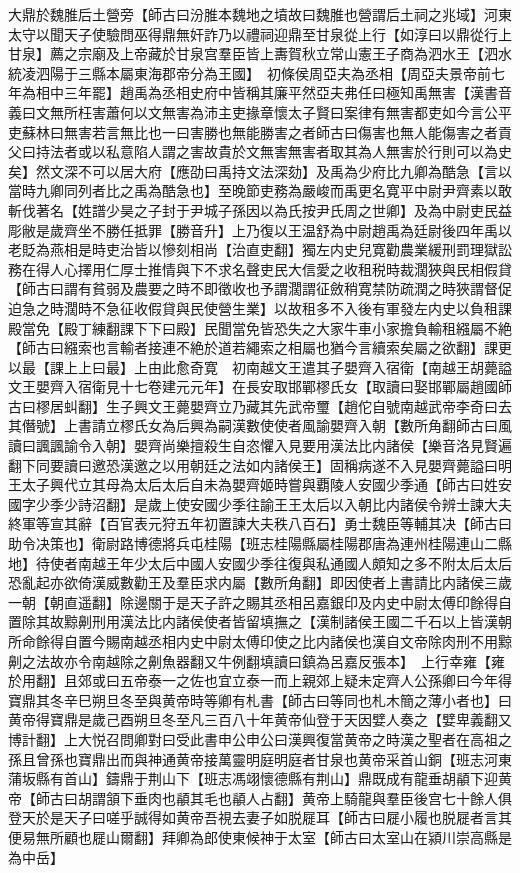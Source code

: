 大鼎於魏脽后土營旁【師古曰汾脽本魏地之墳故曰魏脽也營謂后土祠之兆域】河東太守以聞天子使驗問巫得鼎無奸詐乃以禮祠迎鼎至甘泉從上行【如淳曰以鼎從行上甘泉】薦之宗廟及上帝藏於甘泉宫羣臣皆上夀賀秋立常山憲王子商為泗水王【泗水統凌泗陽于三縣本屬東海郡帝分為王國】　初條侯周亞夫為丞相【周亞夫景帝前七年為相中三年罷】趙禹為丞相史府中皆稱其廉平然亞夫弗任曰極知禹無害【漢書音義曰文無所枉害蕭何以文無害為沛主吏掾章懷太子賢曰案律有無害都吏如今言公平吏蘇林曰無害若言無比也一曰害勝也無能勝害之者師古曰傷害也無人能傷害之者貢父曰持法者或以私意陷人謂之害故貴於文無害無害者取其為人無害於行則可以為史矣】然文深不可以居大府【應劭曰禹持文法深劾】及禹為少府比九卿為酷急【言以當時九卿同列者比之禹為酷急也】至晚節吏務為嚴峻而禹更名寛平中尉尹齊素以敢斬伐著名【姓譜少昊之子封于尹城子孫因以為氏按尹氏周之世卿】及為中尉吏民益彫敝是歲齊坐不勝任抵罪【勝音升】上乃復以王温舒為中尉趙禹為廷尉後四年禹以老貶為燕相是時吏治皆以慘刻相尚【治直吏翻】獨左内史兒寛勸農業緩刑罰理獄訟務在得人心擇用仁厚士推情與下不求名聲吏民大信愛之收租税時裁濶狹與民相假貸【師古曰謂有貧弱及農要之時不即徵收也予謂濶謂征斂稍寛禁防疏潤之時狹謂督促迫急之時濶時不急征收假貸與民使營生業】以故租多不入後有軍發左内史以負租課殿當免【殿丁練翻課下下曰殿】民聞當免皆恐失之大家牛車小家擔負輸租繦屬不絶【師古曰繦索也言輸者接連不絶於道若繩索之相屬也猶今言續索矣屬之欲翻】課更以最【課上上曰最】上由此愈奇寛　初南越文王遣其子嬰齊入宿衛【南越王胡薨謚文王嬰齊入宿衛見十七卷建元元年】在長安取邯鄲樛氏女【取讀曰娶邯鄲屬趙國師古曰樛居虯翻】生子興文王薨嬰齊立乃藏其先武帝璽【趙佗自號南越武帝李奇曰去其僭號】上書請立樛氏女為后興為嗣漢數使使者風諭嬰齊入朝【數所角翻師古曰風讀曰諷諷諭令入朝】嬰齊尚樂擅殺生自恣懼入見要用漢法比内諸侯【樂音洛見賢遍翻下同要讀曰邀恐漢邀之以用朝廷之法如内諸侯王】固稱病遂不入見嬰齊薨謚曰明王太子興代立其母為太后太后自未為嬰齊姬時嘗與覇陵人安國少季通【師古曰姓安國字少季少詩沼翻】是歲上使安國少季往諭王王太后以入朝比内諸侯令辨士諫大夫終軍等宣其辭【百官表元狩五年初置諫大夫秩八百石】勇士魏臣等輔其决【師古曰助令决策也】衛尉路博德將兵屯桂陽【班志桂陽縣屬桂陽郡唐為連州桂陽連山二縣地】待使者南越王年少太后中國人安國少季往復與私通國人頗知之多不附太后太后恐亂起亦欲倚漢威數勸王及羣臣求内屬【數所角翻】即因使者上書請比内諸侯三歲一朝【朝直遥翻】除邊關于是天子許之賜其丞相呂嘉銀印及内史中尉太傅印餘得自置除其故黥劓刑用漢法比内諸侯使者皆留填撫之【漢制諸侯王國二千石以上皆漢朝所命餘得自置今賜南越丞相内史中尉太傅印使之比内諸侯也漢自文帝除肉刑不用黥劓之法故亦令南越除之劓魚器翻又牛例翻填讀曰鎮為呂嘉反張本】　上行幸雍【雍於用翻】且郊或曰五帝泰一之佐也宜立泰一而上親郊上疑未定齊人公孫卿曰今年得寶鼎其冬辛巳朔旦冬至與黄帝時等卿有札書【師古曰等同也札木簡之薄小者也】曰黄帝得寶鼎是歲己酉朔旦冬至凡三百八十年黄帝仙登于天因嬖人奏之【嬖卑義翻又博計翻】上大悦召問卿對曰受此書申公申公曰漢興復當黄帝之時漢之聖者在高祖之孫且曾孫也寶鼎出而與神通黄帝接萬靈明庭明庭者甘泉也黄帝采首山銅【班志河東蒲坂縣有首山】鑄鼎于荆山下【班志馮翊懷德縣有荆山】鼎既成有龍垂胡䫇下迎黄帝【師古曰胡謂頷下垂肉也䫇其毛也䫇人占翻】黄帝上騎龍與羣臣後宫七十餘人俱登天於是天子曰嗟乎誠得如黄帝吾視去妻子如脱屣耳【師古曰屣小履也脱屣者言其便易無所顧也屣山爾翻】拜卿為郎使東候神于太室【師古曰太室山在潁川崇高縣是為中岳】

